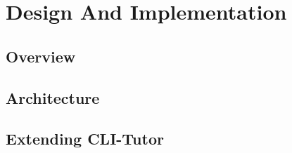 \chapter{Design And Implementation}
\label{chap:design}
\section{Overview}

\section{Architecture}
\section{Extending CLI-Tutor}

